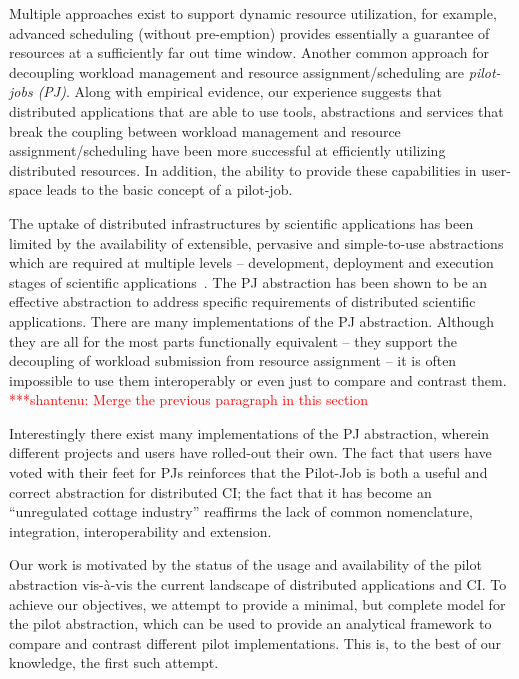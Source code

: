 \documentclass[conference,final]{IEEEtran}
\newcommand{\jhanote}[1]{ {\textcolor{red} { ***shantenu: #1 }}}
\newcommand{\alnote}[1]{ {\textcolor{blue} { ***andre: #1 }}}
\newcommand{\alnote}[1]{}
\newcommand{\jhanote}[1]{}
\begin{document}
Multiple approaches exist to support dynamic resource utilization, for
example, advanced scheduling (without pre-emption) provides
essentially a guarantee of resources %
at a sufficiently far out time window.  Another common approach for
decoupling workload management and resource assignment/scheduling are
\emph{pilot-jobs (PJ)}. Along with empirical evidence, our experience
suggests that distributed applications that are able to use tools,
abstractions and services that break the coupling between workload
management and resource assignment/scheduling have been more
successful at efficiently utilizing distributed resources. In
addition, the ability to provide these capabilities in user-space
leads to the basic concept of a pilot-job.

The uptake of distributed infrastructures by scientific applications
has been limited by the availability of extensible, pervasive and
simple-to-use abstractions which are required at multiple levels –
development, deployment and execution stages of scientific
applications~\cite{dpagrid2009}. The PJ abstraction has been shown to
be an effective abstraction to address specific requirements of
distributed scientific applications. There are many implementations of
the PJ abstraction.  Although they are all for the most parts
functionally equivalent -- they support the decoupling of workload
submission from resource assignment -- it is often impossible to use
them interoperably or even just to compare and contrast them.
\jhanote{Merge the previous paragraph in this section}


Interestingly there exist many implementations of the PJ
abstraction, wherein different projects and users have rolled-out
their own. The fact that users have voted with their feet for
PJs reinforces that the Pilot-Job is both a useful
and correct abstraction for distributed CI; the fact
that it has become an ``unregulated cottage industry'' reaffirms the
lack of common nomenclature, integration, interoperability and
extension.

Our work is
motivated by the status of the usage and availability of the pilot
abstraction vis-\`{a}-vis the current landscape of distributed
applications and CI.  To achieve our objectives, we 
attempt to provide a minimal, but complete model for the pilot
abstraction, which can be used to provide an analytical
framework to compare and contrast different pilot
implementations. This is, to the best of our knowledge, the first such
attempt.
\end{document}
